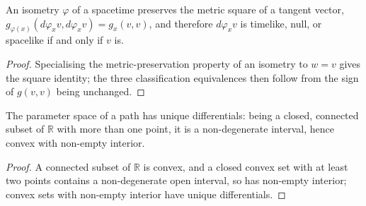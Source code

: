 \begin{lemma}
    \label{lmm:isometry-preserves-classification}
    \leanok
    An isometry $\varphi$ of a spacetime preserves the metric square of a tangent vector, $g_{\varphi(x)}(d\varphi_x v, d\varphi_x v) = g_x(v,v)$, and therefore $d\varphi_x v$ is timelike, null, or spacelike if and only if $v$ is.
\end{lemma}
\begin{proof}
    \leanok
    Specialising the metric-preservation property of an isometry to $w = v$ gives the square identity; the three classification equivalences then follow from the sign of $g(v,v)$ being unchanged.
\end{proof}

\begin{lemma}
    \label{lmm:path-parameter-unique-diff}
    \leanok
    The parameter space of a path has unique differentials: being a closed, connected subset of $\mathbb{R}$ with more than one point, it is a non-degenerate interval, hence convex with non-empty interior.
\end{lemma}
\begin{proof}
    \leanok
    A connected subset of $\mathbb{R}$ is convex, and a closed convex set with at least two points contains a non-degenerate open interval, so has non-empty interior; convex sets with non-empty interior have unique differentials.
\end{proof}

